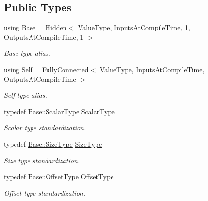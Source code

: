 \subsection*{Public Types}
\begin{DoxyCompactItemize}
\item 
using \hyperlink{classffnn_1_1layer_1_1_fully_connected_a406c6254decac6bb885090f49476f72a}{Base} = \hyperlink{classffnn_1_1layer_1_1_hidden}{Hidden}$<$ Value\-Type, Inputs\-At\-Compile\-Time, 1, Outputs\-At\-Compile\-Time, 1 $>$
\begin{DoxyCompactList}\small\item\em Base type alias. \end{DoxyCompactList}\item 
using \hyperlink{classffnn_1_1layer_1_1_fully_connected_a34f862e03a4a2d070013c6c732563a5f}{Self} = \hyperlink{classffnn_1_1layer_1_1_fully_connected}{Fully\-Connected}$<$ Value\-Type, Inputs\-At\-Compile\-Time, Outputs\-At\-Compile\-Time $>$
\begin{DoxyCompactList}\small\item\em Self type alias. \end{DoxyCompactList}\item 
typedef \hyperlink{classffnn_1_1layer_1_1internal_1_1_interface_a7f834e3365e5199bcbcd16d9abd63941}{Base\-::\-Scalar\-Type} \hyperlink{classffnn_1_1layer_1_1_fully_connected_ac3ff6f72846f84f89c0d6e10f138c7e3}{Scalar\-Type}
\begin{DoxyCompactList}\small\item\em Scalar type standardization. \end{DoxyCompactList}\item 
typedef \hyperlink{classffnn_1_1layer_1_1_hidden_a3deb1dc4b3a83b3d6749474debee025f}{Base\-::\-Size\-Type} \hyperlink{classffnn_1_1layer_1_1_fully_connected_ae1b5e64828482a4c3eea0e2b0ba3f826}{Size\-Type}
\begin{DoxyCompactList}\small\item\em Size type standardization. \end{DoxyCompactList}\item 
typedef \hyperlink{classffnn_1_1layer_1_1_hidden_a4a191bc002b2545231a3d80c99004693}{Base\-::\-Offset\-Type} \hyperlink{classffnn_1_1layer_1_1_fully_connected_a2f79588f597650dc086dfecfc3875d4f}{Offset\-Type}
\begin{DoxyCompactList}\small\item\em Offset type standardization. \end{DoxyCompactList}\item 

\end{DoxyCompactItemize}
